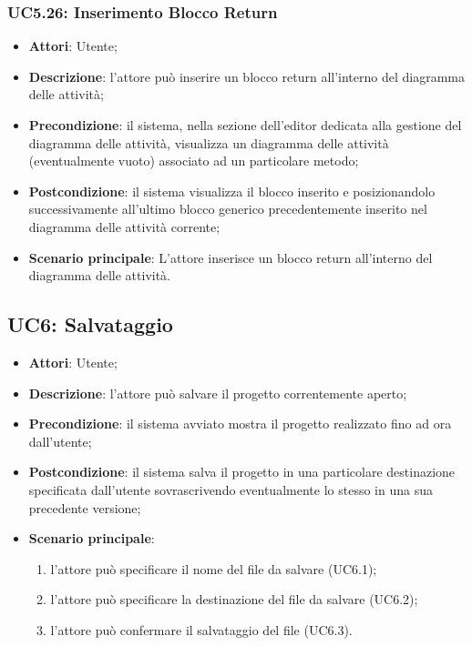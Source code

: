 \begin{itemize}
\begin{itemize}
\begin{itemize}
\begin{itemize}
\subsubsection{UC5.26: Inserimento Blocco Return}
\label{UC5.26}
\begin{itemize}
	\item \textbf{Attori}: Utente;
	\item \textbf{Descrizione}: l'attore può inserire un blocco return all'interno del diagramma delle attività;
	\item \textbf{Precondizione}: il sistema, nella sezione dell'editor dedicata alla gestione del diagramma delle attività, visualizza un diagramma delle attività (eventualmente vuoto) associato ad un particolare metodo;
	\item \textbf{Postcondizione}: il sistema visualizza il blocco inserito e posizionandolo successivamente all'ultimo blocco generico precedentemente inserito nel diagramma delle attività corrente;
	\item \textbf{Scenario principale}: L'attore inserisce un blocco return all'interno del diagramma delle attività.
\end{itemize}

\subsection{UC6: Salvataggio}
\label{UC6}
\begin{itemize}
	\item \textbf{Attori}: Utente;
	\item \textbf{Descrizione}: l'attore può salvare il progetto correntemente aperto;
	\item \textbf{Precondizione}: il sistema avviato mostra il progetto realizzato fino ad ora dall'utente;
	\item \textbf{Postcondizione}: il sistema salva il progetto in una particolare destinazione specificata dall'utente sovrascrivendo eventualmente lo stesso in una sua precedente versione;
	\item \textbf{Scenario principale}:
	\begin{enumerate}
		\item l'attore può specificare il nome del file da salvare (UC6.1);
		\item l'attore può specificare la destinazione del file da salvare (UC6.2);
		\item l'attore può confermare il salvataggio del file (UC6.3).
	\end{enumerate}
\end{itemize}


\end{itemize}
\end{itemize}
\end{itemize}
\end{itemize}

